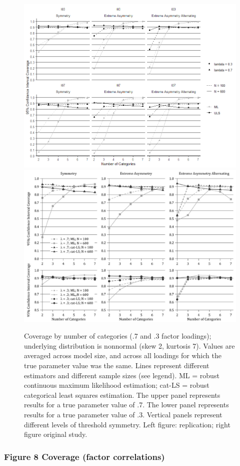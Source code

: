 \documentclass[10,a4paperpaper,]{article}
\begin{document}
\begin{figure}
\includegraphics[width=0.49\linewidth]{./figures/fig7} \includegraphics[width=0.49\linewidth]{./figures/fig7_original} \caption{Coverage by number of categories (.7 and .3 factor loadings); underlying distribution is nonnormal (skew 2, kurtosis 7). Values are averaged across model size, and across all loadings for which the true parameter value was the same. Lines represent different estimators and different sample sizes (see legend). ML = robust continuous maximum likelihood estimation; cat-LS = robust categorical least squares estimation. The upper panel represents results for a true parameter value of .7. The lower panel represents results for a true parameter value of .3. Vertical panels represent different levels of threshold symmetry. Left figure: replication; right figure original study.}\label{fig:fig7}
\end{figure}

\subsubsection{Figure 8 Coverage (factor correlations)}
\end{document}
